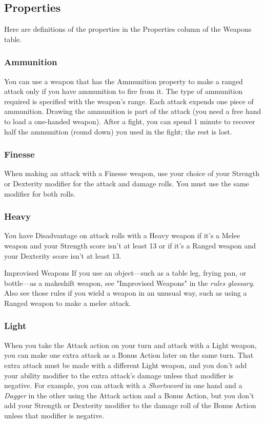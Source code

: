 \documentclass[10pt,a4paper,twoside,bg=print,twocolumn,openany,nodeprecatedcode]{dndbook}
\begin{document}
\subsection{Properties}
Here are definitions of the properties in the Properties column of the Weapons table.

\subsubsection{Ammunition}
You can use a weapon that has the Ammunition property to make a ranged attack only if you have ammunition to fire from it. The type of ammunition required is specified with the weapon's range. Each attack expends one piece of ammunition. Drawing the ammunition is part of the attack (you need a free hand to load a one-handed weapon). After a fight, you can spend 1 minute to recover half the ammunition (round down) you used in the fight; the rest is lost.

\subsubsection{Finesse}
When making an attack with a Finesse weapon, use your choice of your Strength or Dexterity modifier for the attack and damage rolls. You must use the same modifier for both rolls.

\subsubsection{Heavy}
You have Disadvantage on attack rolls with a Heavy weapon if it's a Melee weapon and your Strength score isn't at least 13 or if it's a Ranged weapon and your Dexterity score isn't at least 13.

\begin{DndSidebar}[float=!b]{Improvised Weapons}
If you use an object—such as a table leg, frying pan, or bottle—as a makeshift weapon, see "Improvised Weapons" in the \textit{rules glossary}. Also see those rules if you wield a weapon in an unusual way, such as using a Ranged weapon to make a melee attack.



\end{DndSidebar}

\subsubsection{Light}
When you take the Attack action on your turn and attack with a Light weapon, you can make one extra attack as a Bonus Action later on the same turn. That extra attack must be made with a different Light weapon, and you don't add your ability modifier to the extra attack's damage unless that modifier is negative. For example, you can attack with a \textit{Shortsword} in one hand and a \textit{Dagger} in the other using the Attack action and a Bonus Action, but you don't add your Strength or Dexterity modifier to the damage roll of the Bonus Action unless that modifier is negative.
\end{document}
